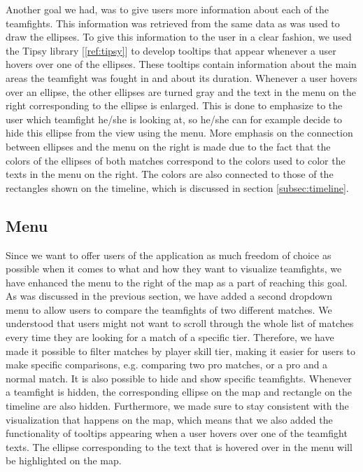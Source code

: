 \documentclass[11pt,twoside,a4paper]{article}
\begin{document}
Another goal we had, was to give users more information about each of the teamfights. This information was retrieved from the same data as was used to draw the ellipses. To give this information to the user in a clear fashion, we used the Tipsy library [\ref{ref:tipsy}]
to develop tooltips that appear whenever a user hovers over one of the ellipses. These tooltips contain information about the main areas the teamfight was fought in and about its duration. Whenever a user hovers over an ellipse, the other ellipses are turned gray and the text in the menu on the right corresponding to the ellipse is enlarged. This is done to emphasize to the user which teamfight he/she is looking at, so he/she can for example decide to hide this ellipse from the view using the menu.\newline\newline
More emphasis on the connection between ellipses and the menu on the right is made due to the fact that the colors of the ellipses of both matches correspond to the colors used to color the texts in the menu on the right. The colors are also connected to those of the rectangles shown on the timeline, which is discussed in section \ref{subsec:timeline}.

\subsection{Menu}
\label{subsec:menu}
Since we want to offer users of the application as much freedom of choice as possible when it comes to what and how they want to visualize teamfights, we have enhanced the menu to the right of the map as a part of reaching this goal. As was discussed in the previous section, we have added a second dropdown menu to allow users to compare the teamfights of two different matches. We understood that users might not want to scroll through the whole list of matches every time they are looking for a match of a specific tier. Therefore, we have made it possible to filter matches by player skill tier, making it easier for users to make specific comparisons, e.g. comparing two pro matches, or a pro and a normal match. It is also possible to hide and show specific teamfights. Whenever a teamfight is hidden, the corresponding ellipse on the map and rectangle on the timeline are also hidden.
\newline\newline
Furthermore, we made sure to stay consistent with the visualization that happens on the map, which means that we also added the functionality of tooltips appearing when a user hovers over one of the teamfight texts. The ellipse corresponding to the text that is hovered over in the menu will be highlighted on the map.
\end{document}
